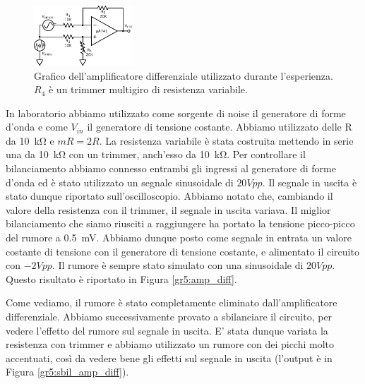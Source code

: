 \begin{figure}
  \begin{center}
    \includegraphics[width=0.33\textwidth]{../E05/latex/c_diff_amp.pdf}
  \end{center}
  \caption{Grafico dell'amplificatore differenziale utilizzato durante l'esperienza. $R_4$ è un trimmer multigiro di resistenza variabile.}
  \label{cir5:diff_amp}
\end{figure}

In laboratorio abbiamo utilizzato come sorgente di noise il generatore di forme d'onda e come $V_{in}$ il generatore di tensione costante. Abbiamo utilizzato delle R da \SI{10}{\kilo\ohm} e $mR=2R$. La resistenza variabile è stata costruita mettendo in serie una da \SI{10}{\kilo\ohm} con un trimmer, anch'esso da \SI{10}{\kilo\ohm}. Per controllare il bilanciamento abbiamo connesso entrambi gli ingressi al generatore di forme d'onda ed è stato utilizzato un segnale sinusoidale di $20Vpp$. Il segnale in uscita è stato dunque riportato sull'oscilloscopio. Abbiamo notato che, cambiando il valore della resistenza con il trimmer, il segnale in uscita variava. Il miglior bilanciamento che siamo riusciti a raggiungere ha portato la tensione picco-picco del rumore a \SI{0.5}{\milli\volt}. Abbiamo dunque posto come segnale in entrata un valore costante di tensione con il generatore di tensione costante, e alimentato il circuito con $-2Vpp$. Il rumore è sempre stato simulato con una sinusoidale di $20Vpp$. Questo risultato è riportato in Figura \ref{gr5:amp_diff}.

Come vediamo, il rumore è stato completamente eliminato dall'amplificatore differenziale. Abbiamo successivamente provato a sbilanciare il circuito, per vedere l'effetto del rumore sul segnale in uscita. E' stata dunque variata la resistenza con trimmer e abbiamo utilizzato un rumore con dei picchi molto accentuati, così da vedere bene gli effetti sul segnale in uscita (l'output è in Figura \ref{gr5:sbil_amp_diff}). 

